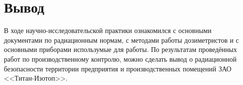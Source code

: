 \chapter{Вывод}
	В ходе научно-исследовательской практики ознакомился с основными 
	документами по радиационным нормам, с методами работы дозиметристов и 
	с основными приборами использумые для работы. По результатам проведённых 
	работ по производственному контролю, можно сделать вывод о радиационной 
	безопасности территории предприятия и производственных помещений 
	ЗАО <<Титан-Изотоп>>.

\clearpage